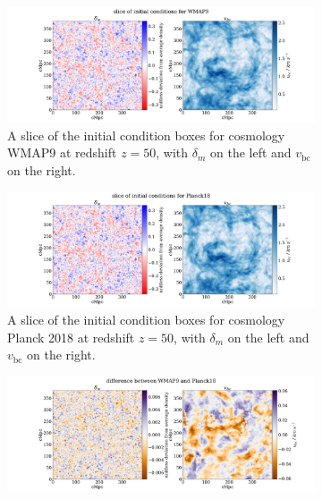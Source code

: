 \documentclass[floats,floatfix,showpacs,amssymb,prd,superscriptaddress,nofootinbib]{revtex4-2} %
\begin{document}
\begin{figure}
     \centering
     \begin{subfigure}[b]{0.9\textwidth}
         \centering
         \includegraphics[width=\textwidth]{images/ic_grids/initial_condition_grid_WMAP9.png}
         \caption{A slice of the initial condition boxes for cosmology WMAP9 \citep{WMAP9results} at redshift $z = 50$, with $\delta_m$ on the left and $v_{\text{bc}}$ on the right.}
         \label{fig:IC_WMAP9}
     \end{subfigure}
     \hfill
     \begin{subfigure}[b]{0.9\textwidth}
         \centering
         \includegraphics[width=\textwidth]{images/ic_grids/initial_condition_grid_Planck18.png}
         \caption{A slice of the initial condition boxes for cosmology Planck 2018 \citep{Planck2018results} at redshift $z = 50$, with $\delta_m$ on the left and $v_{\text{bc}}$ on the right.}
         \label{fig:IC_Planck18}
     \end{subfigure}
     \hfill
     \begin{subfigure}[b]{0.9\textwidth}
         \centering
         \includegraphics[width=\textwidth]{images/ic_grids/difference_in_initial_grid_WMAP9_Planck18.png}

\end{subfigure}
\end{figure}
\end{document}
